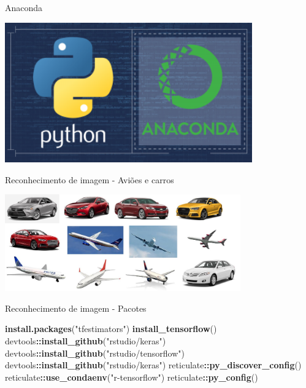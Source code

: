 \documentclass[
  ignorenonframetext,
]{beamer}
\newenvironment{Shaded}{\begin{snugshade}}{\end{snugshade}}
\newcommand{\KeywordTok}[1]{\textcolor[rgb]{0.13,0.29,0.53}{\textbf{#1}}}
\newcommand{\NormalTok}[1]{#1}
\newcommand{\OperatorTok}[1]{\textcolor[rgb]{0.81,0.36,0.00}{\textbf{#1}}}
\newcommand{\StringTok}[1]{\textcolor[rgb]{0.31,0.60,0.02}{#1}}
\begin{document}
\begin{frame}{Anaconda}
\protect\hypertarget{anaconda}{}

\includegraphics[width=4.2in]{IMAGENS/Anaconda}

\begin{center}
\tiny{}
\end{center}

\end{frame}

\begin{frame}{Reconhecimento de imagem - Aviões e carros}
\protect\hypertarget{reconhecimento-de-imagem---aviuxf5es-e-carros}{}

\includegraphics[width=4.0in]{IMAGENS/Avioes_carros}

\begin{center}
\tiny{}
\end{center}

\end{frame}

\begin{frame}[fragile]{Reconhecimento de imagem - Pacotes}
\protect\hypertarget{reconhecimento-de-imagem---pacotes}{}

\begin{Shaded}
\begin{Highlighting}[]
\KeywordTok{install.packages}\NormalTok{(}\StringTok{"tfestimators"}\NormalTok{)}
\KeywordTok{install_tensorflow}\NormalTok{()}
\NormalTok{devtools}\OperatorTok{::}\KeywordTok{install_github}\NormalTok{(}\StringTok{"rstudio/keras"}\NormalTok{)}
\NormalTok{devtools}\OperatorTok{::}\KeywordTok{install_github}\NormalTok{(}\StringTok{"rstudio/tensorflow"}\NormalTok{)}
\NormalTok{devtools}\OperatorTok{::}\KeywordTok{install_github}\NormalTok{(}\StringTok{"rstudio/keras"}\NormalTok{)}
\NormalTok{reticulate}\OperatorTok{::}\KeywordTok{py_discover_config}\NormalTok{()}
\NormalTok{reticulate}\OperatorTok{::}\KeywordTok{use_condaenv}\NormalTok{(}\StringTok{"r-tensorflow"}\NormalTok{)}
\NormalTok{reticulate}\OperatorTok{::}\KeywordTok{py_config}\NormalTok{()}
\end{Highlighting}
\end{Shaded}

\end{frame}
\end{document}

